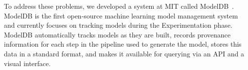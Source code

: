 \documentclass[11pt]{article}
\newcommand{\mdb}{{\sc ModelDB}\xspace}
\begin{document}











To address these problems, we developed a system at MIT called \mdb~\cite{modeldb-hilda}. 
\mdb is the first open-source machine learning model management system and currently focuses on tracking models during the Experimentation phase.
\mdb automatically tracks models as they are built, records 
provenance information for each step in the pipeline used to generate the model, stores this 
data in a standard format, and makes it available for querying via an API and a visual interface.
\end{document}
